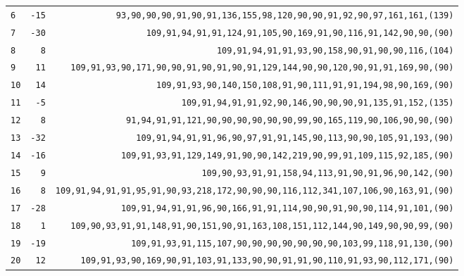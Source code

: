 \begin{table}[!phtb]
\begin{tabular}{@{\hskip 0.31cm}L@{\hskip 0.27cm}r@{\hskip 0.27cm}R@{\hskip 0.34cm}}
		\texttt{6} & \texttt{-15} & \scriptsize\texttt{93,90,90,90,91,90,91,136,155,98,120,90,90,91,92,90,97,161,161,{\color{gray}(139)}} \\
		\texttt{7} & \texttt{-30} & \footnotesize\texttt{109,91,94,91,91,124,91,105,90,169,91,90,116,91,142,90,90,{\color{gray}(90)}} \\
		\texttt{8} & \texttt{8} & \scriptsize\texttt{109,91,94,91,91,93,90,158,90,91,90,90,116,{\color{gray}(104)}} \\
		\texttt{9} & \texttt{11} & \footnotesize\texttt{109,91,93,90,171,90,90,91,90,91,90,91,129,144,90,90,120,90,91,91,169,90,{\color{gray}(90)}} \\
		\texttt{10} & \texttt{14} & \scriptsize\texttt{109,91,93,90,140,150,108,91,90,111,91,91,194,98,90,169,{\color{gray}(90)}} \\
		\texttt{11} & \texttt{-5} & \scriptsize\texttt{109,91,94,91,91,92,90,146,90,90,90,91,135,91,152,{\color{gray}(135)}} \\
		\texttt{12} & \texttt{8} & \scriptsize\texttt{91,94,91,91,121,90,90,90,90,90,90,99,90,165,119,90,106,90,90,{\color{gray}(90)}} \\
		\texttt{13} & \texttt{-32} & \scriptsize\texttt{109,91,94,91,91,96,90,97,91,91,145,90,113,90,90,105,91,193,{\color{gray}(90)}} \\
		\texttt{14} & \texttt{-16} & \scriptsize\texttt{109,91,93,91,129,149,91,90,90,142,219,90,99,91,109,115,92,185,{\color{gray}(90)}} \\
		\texttt{15} & \texttt{9} & \scriptsize\texttt{109,90,93,91,91,158,94,113,91,90,91,96,90,142,{\color{gray}(90)}} \\
		\texttt{16} & \texttt{8} & \scriptsize\texttt{109,91,94,91,91,95,91,90,93,218,172,90,90,90,116,112,341,107,106,90,163,91,{\color{gray}(90)}} \\
		\texttt{17} & \texttt{-28} & \scriptsize\texttt{109,91,94,91,91,96,90,166,91,91,114,90,90,91,90,90,114,91,101,{\color{gray}(90)}} \\
		\texttt{18} & \texttt{1} & \scriptsize\texttt{109,90,93,91,91,148,91,90,151,90,91,163,108,151,112,144,90,149,90,90,99,{\color{gray}(90)}} \\
		\texttt{19} & \texttt{-19} & \scriptsize\texttt{109,91,93,91,115,107,90,90,90,90,90,90,90,103,99,118,91,130,{\color{gray}(90)}} \\
		\texttt{20} & \texttt{12} & \scriptsize\texttt{109,91,93,90,169,90,91,103,91,133,90,90,91,91,90,110,91,93,90,112,171,{\color{gray}(90)}} \\

\end{tabular}
\end{table}
